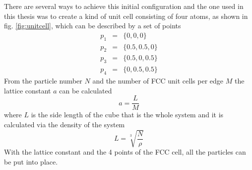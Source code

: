 \documentclass[12pt]{article}
\begin{document}
There are several ways to achieve this initial configuration and the one used in this thesis \cite{buffalo} was to create a kind of unit cell 
consisting of four atoms, as shown in fig. \ref{fig:unitcell}, which can be described by a set of points
\begin{eqnarray*}
    p_1 &=& \{0,0,0\}\\
    p_2 &=& \{0.5,0.5,0\}\\
    p_3 &=& \{0.5,0,0.5\}\\
    p_4 &=& \{0,0.5,0.5\}
\end{eqnarray*}
From the particle number $N$ and the number of FCC unit cells per edge $M$ the lattice constant $a$ can be calculated
\begin{equation}
    a = \frac{L}{M}
\end{equation}
where $L$ is the side length of the cube that is the whole system and it is calculated via the density of the system
\begin{equation}
    L = \sqrt[3]{\frac{N}{\rho}}
\end{equation}
With the lattice constant and the 4 points of the FCC cell, all the particles can be put into place.
\end{document}
